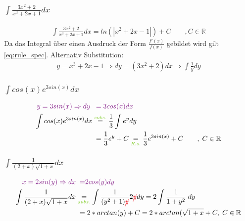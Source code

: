 \documentclass[12pt,a4paper]{article}%
\numberwithin{equation}{section}
\newcommand{\R}{\mathbb{R}} %
\def\colBord#1{\begingroup\color{Fuchsia}{#1}\endgroup}
\def\colRed#1{\begingroup\color{Red}{#1}\endgroup}
\def\colGreen#1{\begingroup\color{LimeGreen}{#1}\endgroup}
\def\usGreen#1#2{\underset{\colGreen{#1}}{#2}}
\begin{document}
\subsubsection{$\int \frac{3x^2+2}{x^3+2x+1}dx$}
\begin{align}
\int \frac{3x^2+2}{x^3+2x+1}dx = ln(|x^2+2x-1|) + C \qquad ,C\in\R\label{eq:ex5}
\end{align}
Da das Integral über einen Ausdruck der Form $\frac{f'(x)}{f(x)}$ gebildet wird gilt \eqref{eq:rule_spec}. Alternativ Substitution:
\begin{align*}
y = x^3+2x-1 \Rightarrow dy = (3x^2+2) dx \Rightarrow \int \frac{1}{y}dy
\end{align*}

\subsubsection{$\int cos(x) e^{3sin(x)}dx$}
\begin{align}
\colBord{y = 3sin(x) \Rightarrow dy}\; &\;\;\colBord{=} \; \colBord{3cos(x) dx} \nonumber\\
\int cos(x) e^{3sin(x)}dx &\overset{\colGreen{subs.}}{=} \frac{1}{3} \int e^y dy \nonumber\\
&\;= \frac{1}{3} e^y + C \usGreen{R.s.}{=} \frac{1}{3}e^{3sin(x)} + C \qquad , \; C\in\R
\end{align}

\subsubsection{$\int \frac{1}{(2+x) \sqrt{1+x}}dx$}
\begin{align}
\colBord{x = 2sin(y) \Rightarrow dx} &\;\;\colBord{=} \colBord{2cos(y) dy} \nonumber\\
\int \frac{1}{(2+x) \sqrt{1+x}}dx &\usGreen{subs.}{=} 
\int \frac{1}{(y^2 + 1) \colRed{\cancel{y}}} 2\colRed{\cancel{y}} dy 
= 2\int \frac{1}{1+y^2}\;dy \nonumber\\
&\;= 2*arctan(y) + C = 2* arctan(\sqrt{1+x} + C ,\;C\in\R
\end{align}
\end{document}

